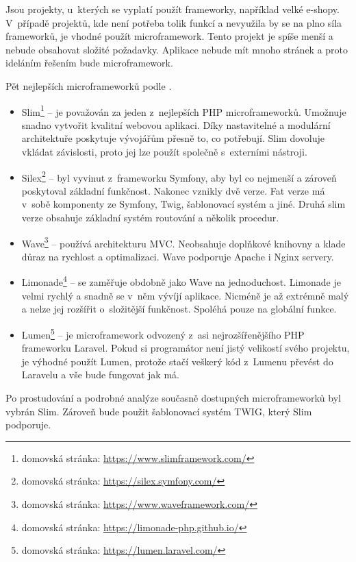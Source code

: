            Jsou projekty, u~kterých se vyplatí použít frameworky, například velké e-shopy. V~případě projektů, kde není potřeba tolik funkcí a nevyužila by se na plno síla frameworků, je vhodné použít microframework. Tento projekt je spíše menší a nebude obsahovat složité požadavky. Aplikace nebude mít mnoho stránek a proto ideláním řešením bude microframework.
            
            Pět nejlepších microframeworků podle \cite{microframeworks}.
            
            \begin{itemize}
                \item Slim\footnote{domovská stránka: \url{https://www.slimframework.com/}} – je považován za jeden z~nejlepších PHP microframeworků. Umožnuje snadno vytvořit kvalitní webovou aplikaci. Díky nastavitelné a modulární architektuře poskytuje vývojářům přesně to, co potřebují. Slim dovoluje vkládat závislosti, proto jej lze použít společně s~externími nástroji.
                
                \item Silex\footnote{domovská stránka: \url{https://silex.symfony.com/}} – byl vyvinut z~frameworku Symfony, aby byl co nejmenší a zároveň poskytoval základní funkčnost. Nakonec vznikly dvě verze. Fat verze má v~sobě komponenty ze Symfony, Twig, šablonovací systém a jiné. Druhá slim verze obsahuje základní systém routování a několik procedur. 
                
                \item Wave\footnote{domovská stránka: \url{https://www.waveframework.com/}} – používá architekturu MVC. Neobsahuje doplňkové knihovny a klade důraz na rychlost a optimalizaci. Wave podporuje Apache i Nginx servery.
                
                \item Limonade\footnote{domovská stránka: \url{https://limonade-php.github.io/}} – se zaměřuje obdobně jako Wave na jednoduchost. Limonade je velmi rychlý a snadně se v~něm vývíjí aplikace. Nicméně je až extrémně malý a nelze jej rozšířit o~složitější funkčnost. Spoléhá pouze na globální funkce.
                
                \item Lumen\footnote{domovská stránka: \url{https://lumen.laravel.com/}} – je microframework odvozený z~asi nejrozšířenějšího PHP frameworku Laravel. Pokud si programátor není jistý velikostí svého projektu, je výhodné použít Lumen, protože stačí veškerý kód z~Lumenu převést do Laravelu a vše bude fungovat jak má.
            \end{itemize}
        
        Po prostudování a podrobné analýze současně dostupných microframeworků byl vybrán Slim. Zároveň bude použit šablonovací systém TWIG, který Slim podporuje.
        
